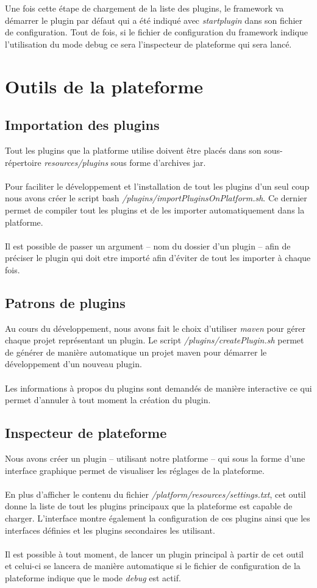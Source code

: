 \documentclass[12pt,a4paper]{article}
\begin{document}
Une fois cette étape de chargement de la liste des plugins, le framework va 
démarrer le plugin par défaut qui a été indiqué avec \emph{startplugin} dans son 
fichier de configuration. Tout de fois, si le fichier de configuration du 
framework indique l'utilisation du mode debug ce sera l'inspecteur de plateforme 
qui sera lancé.

\section{Outils de la plateforme}
\subsection{Importation des plugins}
Tout les plugins que la platforme utilise doivent être placés dans son sous-
répertoire \emph{resources/plugins} sous forme d'archives jar.
\\\\
Pour faciliter le développement et l'installation de tout les plugins d'un seul 
coup nous avons créer le script bash \emph{/plugins/importPluginsOnPlatform.sh}.
Ce dernier permet de compiler tout les plugins et de les importer automatiquement
dans la platforme.
\\\\
Il est possible de passer un argument -- nom du dossier d'un plugin -- afin de 
préciser le plugin qui doit etre importé afin d'éviter de tout les importer
à chaque fois.

\subsection{Patrons de plugins}
Au cours du développement, nous avons fait le choix d'utiliser \emph{maven} 
pour gérer chaque projet représentant un plugin. Le script 
\emph{/plugins/createPlugin.sh} permet de générer de manière automatique un 
projet maven pour démarrer le développement d'un nouveau plugin.
\\\\
Les informations à propos du plugins sont demandés de manière interactive ce
qui permet d'annuler à tout moment la création du plugin.

\subsection{Inspecteur de plateforme}
Nous avons créer un plugin -- utilisant notre platforme -- qui sous la forme
d'une interface graphique permet de visualiser les réglages de la plateforme.
\\\\
En plus d'afficher le contenu du fichier \emph{/platform/resources/settings.txt}, 
cet outil donne la liste de tout les plugins principaux que la plateforme
est capable de charger. L'interface montre également la configuration de ces plugins
ainsi que les interfaces définies et les plugins secondaires les utilisant.
\\\\
Il est possible à tout moment, de lancer un plugin principal à partir de cet outil 
et celui-ci se lancera de manière automatique si le fichier de configuration 
de la plateforme indique que le mode \emph{debug} est actif.
\end{document}
